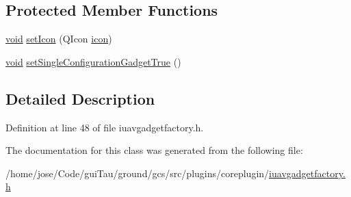 \subsection*{Protected Member Functions}
\begin{DoxyCompactItemize}
\item 
\hyperlink{group___u_a_v_objects_plugin_ga444cf2ff3f0ecbe028adce838d373f5c}{void} \hyperlink{group___core_plugin_ga2264241e26aef2218c7c7d7fe2193389}{set\-Icon} (Q\-Icon \hyperlink{group___core_plugin_ga7db897c61f93d0d66f80236e4433d9f7}{icon})
\item 
\hyperlink{group___u_a_v_objects_plugin_ga444cf2ff3f0ecbe028adce838d373f5c}{void} \hyperlink{group___core_plugin_ga20d35e5c705997979d5c230dbdd42e0e}{set\-Single\-Configuration\-Gadget\-True} ()
\end{DoxyCompactItemize}


\subsection{Detailed Description}


Definition at line 48 of file iuavgadgetfactory.\-h.



The documentation for this class was generated from the following file\-:\begin{DoxyCompactItemize}
\item 
/home/jose/\-Code/gui\-Tau/ground/gcs/src/plugins/coreplugin/\hyperlink{iuavgadgetfactory_8h}{iuavgadgetfactory.\-h}\end{DoxyCompactItemize}

